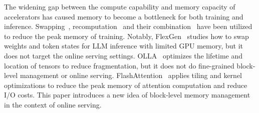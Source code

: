 The widening gap between the compute capability and memory capacity of accelerators has caused memory to become a bottleneck for both training and inference.
Swapping~\cite{huang2020swapadvisor,wang2018superneurons,ren2021zero}, recomputation~\cite{chen2016training,jain2020checkmate} and their combination~\cite{patil2022poet} have been utilized to reduce the peak memory of training.
Notably, FlexGen~\cite{sheng2023high} studies how to swap weights and token states for LLM inference with limited GPU memory, but it does not target the online serving settings.
OLLA~\cite{steiner2022olla} optimizes the lifetime and location of tensors to reduce fragmentation, but it does not do fine-grained block-level management or online serving.
FlashAttention~\cite{dao2022flashattention} applies tiling and kernel optimizations to reduce the peak memory of attention computation and reduce I/O costs.
This paper introduces a new idea of block-level memory management in the context of online serving.

